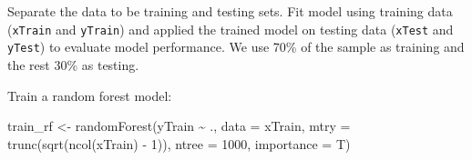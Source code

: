 \documentclass[
  12pt,
]{krantz}
\makeatletter
\newenvironment{Shaded}{\begin{snugshade}}{\end{snugshade}}
\newcommand{\AttributeTok}[1]{\textcolor[rgb]{0.61,0.61,0.61}{#1}}
\newcommand{\CommentTok}[1]{\textcolor[rgb]{0.37,0.37,0.37}{\textit{#1}}}
\newcommand{\DecValTok}[1]{\textcolor[rgb]{0.06,0.06,0.06}{#1}}
\newcommand{\FloatTok}[1]{\textcolor[rgb]{0.06,0.06,0.06}{#1}}
\newcommand{\FunctionTok}[1]{\textcolor[rgb]{0,0,0}{#1}}
\newcommand{\NormalTok}[1]{#1}
\newcommand{\OtherTok}[1]{\textcolor[rgb]{0.37,0.37,0.37}{#1}}
\newcommand{\SpecialCharTok}[1]{\textcolor[rgb]{0,0,0}{#1}}
\newenvironment{kframe}{%
\medskip{}
\setlength{\fboxsep}{.8em}
 \def\at@end@of@kframe{}%
 \ifinner\ifhmode%
  \def\at@end@of@kframe{\end{minipage}}%
  \begin{minipage}{\columnwidth}%
 \fi\fi%
 \def\FrameCommand##1{\hskip\@totalleftmargin \hskip-\fboxsep
 \colorbox{shadecolor}{##1}\hskip-\fboxsep
     \hskip-\linewidth \hskip-\@totalleftmargin \hskip\columnwidth}%
 \MakeFramed {\advance\hsize-\width
   \@totalleftmargin\z@ \linewidth\hsize
   \@setminipage}}%
 {\par\unskip\endMakeFramed%
 \at@end@of@kframe}
\renewenvironment{Shaded}{\begin{kframe}}{\end{kframe}}
\makeatother
\begin{document}
Separate the data to be training and testing sets. Fit model using training data (\texttt{xTrain} and \texttt{yTrain}) and applied the trained model on testing data (\texttt{xTest} and \texttt{yTest}) to evaluate model performance. We use 70\% of the sample as training and the rest 30\% as testing.

\begin{Shaded}
\end{Shaded}

Train a random forest model:

\begin{Shaded}
\begin{Highlighting}[]
\NormalTok{train\_rf }\OtherTok{\textless{}{-}} \FunctionTok{randomForest}\NormalTok{(yTrain }\SpecialCharTok{\textasciitilde{}}\NormalTok{ ., }
                         \AttributeTok{data =}\NormalTok{ xTrain, }
                         \AttributeTok{mtry =} \FunctionTok{trunc}\NormalTok{(}\FunctionTok{sqrt}\NormalTok{(}\FunctionTok{ncol}\NormalTok{(xTrain) }\SpecialCharTok{{-}} \DecValTok{1}\NormalTok{)),}
                         \AttributeTok{ntree =} \DecValTok{1000}\NormalTok{, }
                         \AttributeTok{importance =}\NormalTok{ T)}
\end{Highlighting}
\end{Shaded}
\end{document}
